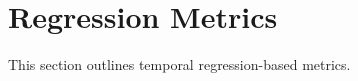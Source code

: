 \section{Regression Metrics}
\label{sec:regressionmetrics}

This section outlines temporal regression-based metrics.